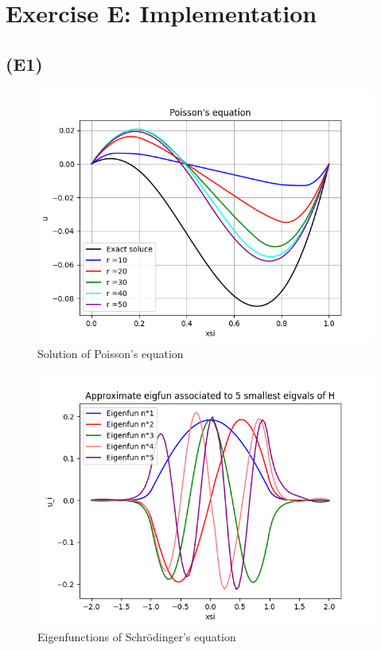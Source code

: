 \documentclass{article}
\begin{document}
\section{Exercise E: Implementation}
\subsection*{(E1)}
\begin{figure}[h]
\centering
\includegraphics[width=\textwidth]{figures/E1_latex.png}
\caption{Solution of Poisson's equation}
\label{fig:poisson}
\end{figure}

\begin{figure}[h]
\centering
\includegraphics[width=\textwidth]{figures/E2_latex.png}
\caption{Eigenfunctions of Schrödinger's equation}
\label{fig:Schrödinger}
\end{figure}
\end{document}

